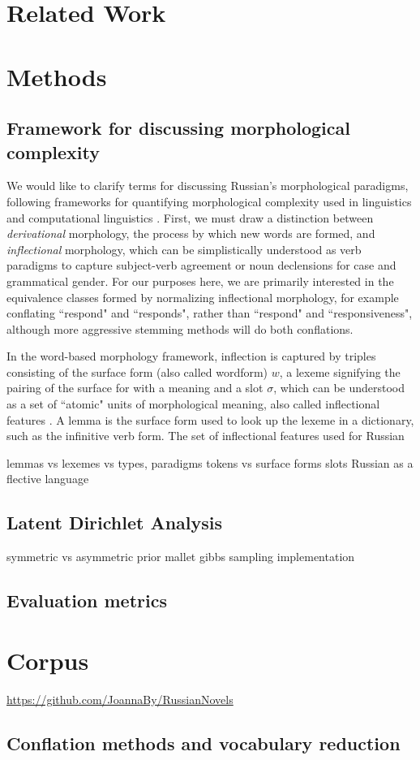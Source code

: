 \documentclass[11pt,a4paper]{article}
\begin{document}
\section{Related Work}

\section{Methods}
\subsection{Framework for discussing morphological complexity}
We would like to clarify terms for discussing Russian's morphological paradigms, following frameworks for quantifying morphological complexity used in linguistics and computational linguistics \cite{baerman2015intro, cotterell-etal-2019-complexity}. First, we must draw a distinction between \textit{derivational} morphology, the process by which new words are formed, and \textit{inflectional} morphology, which can be simplistically understood as verb paradigms to capture subject-verb agreement or noun declensions for case and grammatical gender. For our purposes here, we are primarily interested in the equivalence classes formed by normalizing inflectional morphology, for example conflating ``respond" and ``responds", rather than ``respond" and ``responsiveness", although more aggressive stemming methods will do both conflations.

In the word-based morphology framework, inflection is captured by triples consisting of the surface form (also called wordform) $w$, a lexeme signifying the pairing of the surface for with a meaning and a slot $\sigma$, which can be understood as a set of ``atomic" units of morphological meaning, also called inflectional features \cite{aronoff1976word,sylak-glassman-etal-2015-language,cotterell-etal-2019-complexity}.
A lemma is the surface form used to look up the lexeme in a dictionary, such as the infinitive verb form. The set of inflectional features used for Russian



lemmas vs lexemes vs types, paradigms
tokens vs surface forms
slots
Russian as a flective language

\subsection{Latent Dirichlet Analysis}
symmetric vs asymmetric prior
mallet gibbs sampling implementation

\subsection{Evaluation metrics}

\section{Corpus}

\url{https://github.com/JoannaBy/RussianNovels}
\subsection{Conflation methods and vocabulary reduction}




\end{document}
